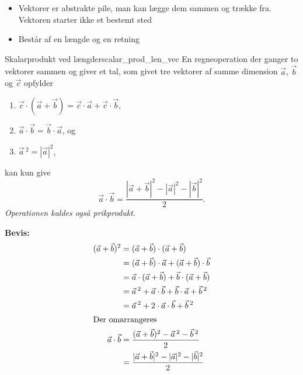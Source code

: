 \documentclass{article}
\begin{document}
\begin{itemize}
	\item Vektorer er abstrakte pile, man kan lægge dem sammen og trække fra.
		Vektoren starter ikke et bestemt sted
	\item Består af en længde og en retning
\end{itemize}
\begin{theorem}{Skalarprodukt ved længder}{scalar_prod_len_vec}
	En regneoperation der ganger to vektorer sammen og giver et tal, som givet
	tre vektorer af samme dimension $\vec{a}$, $\vec{b}$ og $\vec{c}$ opfylder
	\begin{enumerate}
		\item $\vec{c} \cdot (\vec{a} + \vec{b}) = \vec{c} \cdot \vec{a} + \vec{c} \cdot \vec{b}$,
		\item $\vec{a} \cdot \vec{b} = \vec{b} \cdot \vec{a}$, og
		\item $\vec{a}\,^2 = |\vec{a}|^2$,
	\end{enumerate}
	kan kun give
	\[
		\vec{a} \cdot \vec{b} = \frac{|\vec{a} + \vec{b}|^2 - |\vec{a}|^2 - |\vec{b}|^2}{2}.
	\] 
	\textit{Operationen kaldes også prikprodukt}.
\end{theorem}
\textbf{Bevis:}
\begin{align*}
	(\vec{a} + \vec{b})^2 &= (\vec{a} + \vec{b}) \cdot (\vec{a} + \vec{b})\\
						  &= (\vec{a} + \vec{b}) \cdot \vec{a} + (\vec{a} + \vec{b}) \cdot \vec{b}\\
						  &= \vec{a} \cdot (\vec{a} + \vec{b}) + \vec{b} \cdot (\vec{a} + \vec{b})\\
						  &= \vec{a}\,^2 + \vec{a} \cdot \vec{b} + \vec{b} \cdot \vec{a} + \vec{b}\,^2\\
						  &= \vec{a}\,^2 + 2 \cdot \vec{a} \cdot \vec{b} + \vec{b}\,^2\\
						  \intertext{Der omarrangeres}
	\vec{a} \cdot \vec{b} &= \frac{(\vec{a} + \vec{b})^2 - \vec{a}\,^2 - \vec{b}\,^2}{2}\\
						  &= \frac{|\vec{a} + \vec{b}|^2 - |\vec{a}|^2 - |\vec{b}|^2}{2}
\end{align*}
\end{document}
